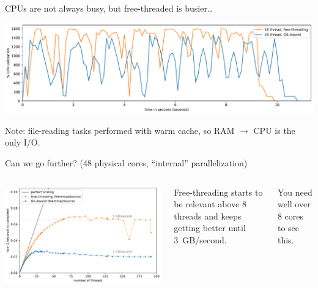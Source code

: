 \documentclass[aspectratio=169]{beamer}
\begin{document}
\begin{frame}{CPUs are not always busy, but free-threaded is busier\ldots}
\vspace{1 cm}
\begin{center}
\includegraphics[width=0.93\linewidth]{img/cpu-of-uproot-internal-16.pdf}

\vspace{0.5 cm}
Note: file-reading tasks performed with warm cache, so RAM $\to$ CPU is the only I/O.
\end{center}
\end{frame}

\begin{frame}{Can we go further? (48 physical cores, ``internal'' parallelization)}
\large
\vspace{0.5 cm}
\begin{columns}
\includegraphics[width=\linewidth]{img/scaling-of-uproot-internal-big.pdf}

Free-threading starts to be relevant above 8 threads and keeps getting better until 3~GB/second.

\vspace{1 cm}
You need well over 8 cores to see this.
\end{columns}
\end{frame}
\end{document}

